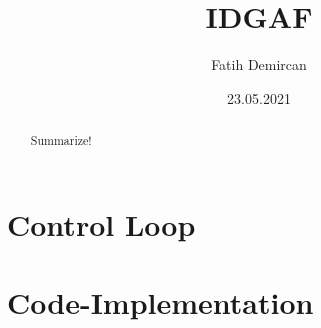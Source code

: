 \documentclass[11pt,a4paper,oneside]{article}
\begin{document}
\title{IDGAF}
\author{Fatih Demircan}
\date{23.05.2021}

\maketitle
\begin{abstract}
Summarize!
\end{abstract}



\section*{Control Loop}
\lipsum[2]
\section*{Code-Implementation}
\lipsum[3]
\end{document}
